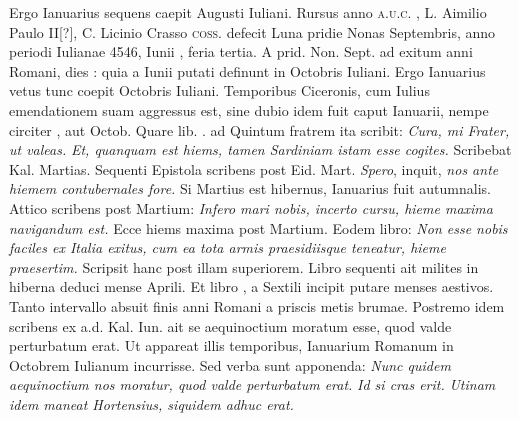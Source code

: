 Ergo Ianuarius sequens caepit  Augusti Iuliani.
Rursus anno \textsc{a.u.c.} , L. Aimilio Paulo II[?],
 C. Licinio Crasso
 \textsc{coss.} defecit
Luna pridie Nonas Septembris, anno periodi Iulianae 4546, Iunii
, feria tertia.
A prid. Non. Sept. %
 ad exitum anni Romani, dies
: quia a  Iunii putati definunt in 
 Octobris Iuliani.
Ergo
Ianuarius vetus tunc coepit  Octobris Iuliani.
Temporibus
Ciceronis, cum Iulius emendationem suam aggressus est, sine dubio
idem fuit caput Ianuarii, nempe circiter , aut 
 Octob. %
Quare lib. %
 . ad Quintum fratrem ita scribit: \textit{Cura, mi Frater, ut valeas.}
\textit{Et, quanquam est hiems, tamen Sardiniam istam esse cogites.}
Scribebat
 Kal. Martias. %
Sequenti Epistola scribens post  Eid. Mart. %
 \textit{Spero},
inquit, \textit{nos ante hiemem contubernales fore.}
Si Martius est hibernus,
Ianuarius fuit autumnalis.
Attico scribens post Martium: \textit{Infero mari
nobis, incerto cursu, hieme maxima navigandum est.}
Ecce hiems
maxima post Martium.
Eodem libro: \textit{Non esse nobis faciles ex Italia
exitus, cum ea tota armis praesidiisque teneatur, hieme praesertim.}
Scripsit
hanc post illam superiorem.
Libro sequenti ait milites in hiberna
deduci mense Aprili.
Et libro , a Sextili incipit putare menses aestivos.
Tanto intervallo absuit finis anni Romani a priscis metis brumae.
Postremo idem scribens ex a.d.  Kal. Iun. %
 ait se aequinoctium
moratum esse, quod valde perturbatum erat.
Ut appareat illis
temporibus, Ianuarium Romanum in Octobrem Iulianum incurrisse.
Sed verba sunt apponenda: \textit{Nunc quidem aequinoctium nos
moratur, quod valde perturbatum erat.}
\textit{Id si cras erit.}
\textit{Utinam idem
maneat Hortensius, siquidem adhuc erat.}
